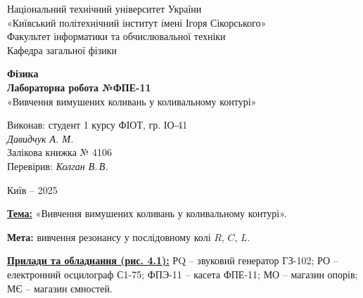 \documentclass[12pt,a4paper]{article}
\begin{document}
    \begin{titlepage}

        \thispagestyle{empty}
        \begin{center}
        \large
        Національний технічний університет України\\
        «Київський політехнічний інститут імені Ігоря Сікорського»\\[1em]
        Факультет інформатики та обчислювальної техніки\\
        Кафедра загальної фізики
        \end{center}

        \vfill

        \begin{center}
        \textbf{\LARGE Фізика}\\[2em]
        \textbf{\Large Лабораторна робота №ФПЕ-11}\\
        «Вивчення вимушених коливань у коливальному контурі» 
        \end{center}

        \vfill

        \begin{flushright}
        Виконав: студент 1 курсу ФІОТ, гр. ІО-41\\
        \textit{Давидчук А. М.}\\
        Залікова книжка № 4106\\[1em]
        Перевірив: \textit{Колган В.\,В.}
        \end{flushright}

        \vfill

        \begin{center}
        Київ -- 2025
        \end{center}

    \end{titlepage}

    \setlength{\parindent}{0pt}

    \textbf{\underline{Тема:}} «Вивчення вимушених коливань у коливальному контурі».

    \vspace{1em}

    \textbf{Мета:} вивчення резонансу у послідовному колі $R$, $C$, $L$.

    \vspace{1em}

    \textbf{\underline{Прилади та обладнання (рис. 4.1):}}
    РQ – звуковий генератор ГЗ-102; РО – електронний осцилограф С1-75;
    ФПЭ-11 – касета ФПЕ-11; МО – магазин опорів; МЄ – магазин ємностей.
\end{document}
